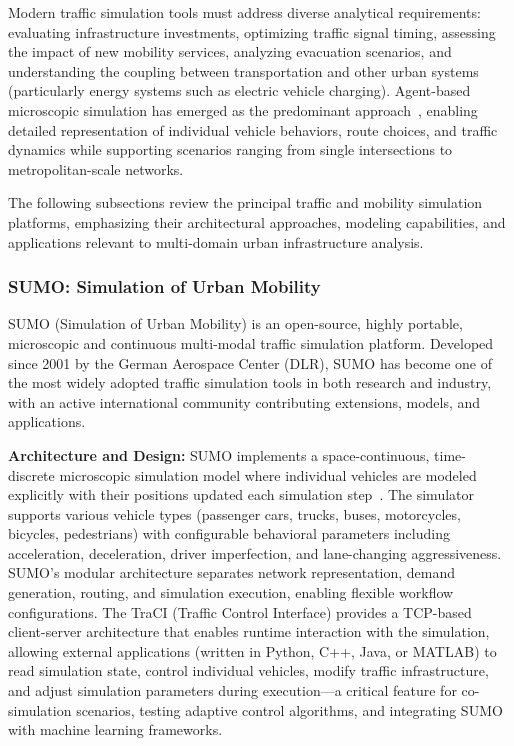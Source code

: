 Modern traffic simulation tools must address diverse analytical requirements: evaluating infrastructure investments, optimizing traffic signal timing, assessing the impact of new mobility services, analyzing evacuation scenarios, and understanding the coupling between transportation and other urban systems (particularly energy systems such as electric vehicle charging). Agent-based microscopic simulation has emerged as the predominant approach~\cite{agent_traffic_overview}, enabling detailed representation of individual vehicle behaviors, route choices, and traffic dynamics while supporting scenarios ranging from single intersections to metropolitan-scale networks.

The following subsections review the principal traffic and mobility simulation platforms, emphasizing their architectural approaches, modeling capabilities, and applications relevant to multi-domain urban infrastructure analysis.


\subsubsection{SUMO: Simulation of Urban Mobility}

SUMO (Simulation of Urban Mobility) is an open-source, highly portable, microscopic and continuous multi-modal traffic simulation platform. Developed since 2001 by the German Aerospace Center (DLR), SUMO has become one of the most widely adopted traffic simulation tools in both research and industry, with an active international community contributing extensions, models, and applications.

\textbf{Architecture and Design:} SUMO implements a space-continuous, time-discrete microscopic simulation model where individual vehicles are modeled explicitly with their positions updated each simulation step~\cite{sumo_application}. The simulator supports various vehicle types (passenger cars, trucks, buses, motorcycles, bicycles, pedestrians) with configurable behavioral parameters including acceleration, deceleration, driver imperfection, and lane-changing aggressiveness. SUMO's modular architecture separates network representation, demand generation, routing, and simulation execution, enabling flexible workflow configurations. The TraCI (Traffic Control Interface) provides a TCP-based client-server architecture that enables runtime interaction with the simulation, allowing external applications (written in Python, C++, Java, or MATLAB) to read simulation state, control individual vehicles, modify traffic infrastructure, and adjust simulation parameters during execution—a critical feature for co-simulation scenarios, testing adaptive control algorithms, and integrating SUMO with machine learning frameworks.

